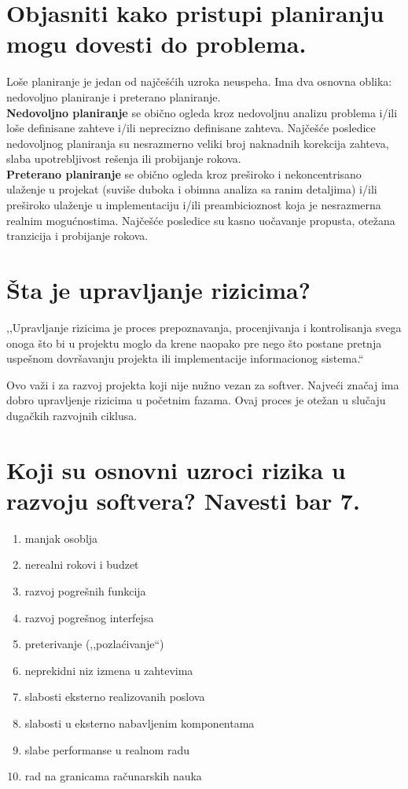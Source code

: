 \documentclass[a4paper]{article}
\begin{document}
\section{Objasniti kako pristupi planiranju mogu dovesti do problema.}
    Loše planiranje je jedan od najčešćih uzroka neuspeha. Ima dva osnovna oblika:
    nedovoljno planiranje i preterano planiranje.\\
    \indent \textbf{Nedovoljno planiranje} se obično ogleda kroz nedovoljnu analizu problema
    i/ili loše definisane zahteve i/ili neprecizno definisane zahteva. Najčešće posledice
    nedovoljnog planiranja su nesrazmerno veliki broj naknadnih korekcija zahteva,
    slaba upotrebljivost rešenja ili probijanje rokova.\\
    \indent \textbf{Preterano planiranje} se obično ogleda kroz preširoko i nekoncentrisano ulaženje 
    u projekat (suviše duboka i obimna analiza sa ranim detaljima) 
    i/ili preširoko ulaženje u implementaciju
    i/ili preambicioznost koja je nesrazmerna realnim mogućnostima. Najčešće posledice su
    kasno uočavanje propusta, otežana tranzicija i probijanje rokova. 

\section{Šta je upravljanje rizicima?}
      ,,Upravljanje rizicima je proces prepoznavanja, procenjivanja i kontrolisanja 
      svega onoga što bi u projektu moglo da krene naopako pre nego što 
      postane pretnja uspešnom dovršavanju projekta ili implementacije 
      informacionog sistema.``
  \\[5pt]

  Ovo važi i za razvoj projekta koji nije nužno vezan za softver. Najveći značaj ima 
  dobro upravljenje rizicima u početnim fazama. Ovaj proces je otežan u slučaju dugačkih 
  razvojnih ciklusa.
 
\section{Koji su osnovni uzroci rizika u razvoju softvera? Navesti bar 7.}
  \begin{enumerate}
  \item manjak osoblja
  \item nerealni rokovi i budzet
  \item razvoj pogrešnih funkcija
  \item razvoj pogrešnog interfejsa
  \item preterivanje (,,pozlaćivanje``)
  \item neprekidni niz izmena u zahtevima
  \item slabosti eksterno realizovanih poslova
  \item slabosti u eksterno nabavljenim komponentama
  \item slabe performanse u realnom radu
  \item rad na granicama računarskih nauka
  \end{enumerate}
\end{document}

